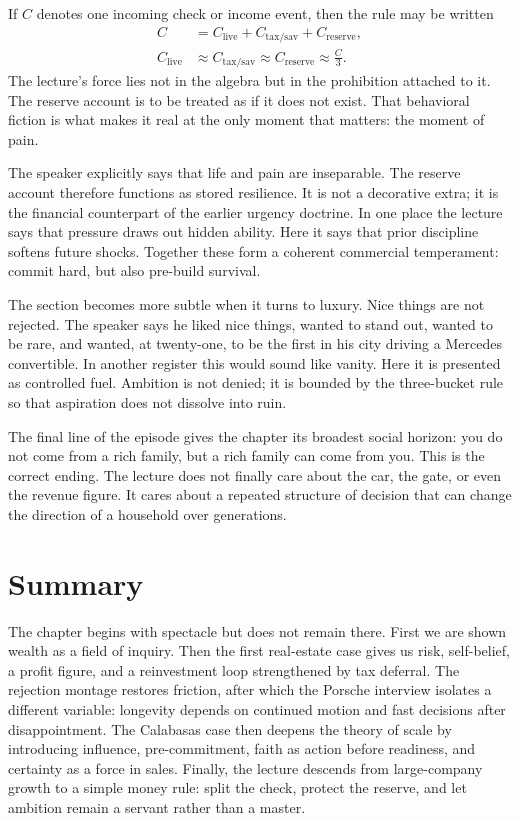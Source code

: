 If \(C\) denotes one incoming check or income event, then the rule may be written
\begin{align}
C &= C_{\text{live}} + C_{\text{tax/sav}} + C_{\text{reserve}},\\
C_{\text{live}} &\approx C_{\text{tax/sav}} \approx C_{\text{reserve}} \approx \frac{C}{3}.
\end{align}
The lecture's force lies not in the algebra but in the prohibition attached to it. The reserve account is to be treated as if it does not exist. That behavioral fiction is what makes it real at the only moment that matters: the moment of pain.

The speaker explicitly says that life and pain are inseparable. The reserve account therefore functions as stored resilience. It is not a decorative extra; it is the financial counterpart of the earlier urgency doctrine. In one place the lecture says that pressure draws out hidden ability. Here it says that prior discipline softens future shocks. Together these form a coherent commercial temperament: commit hard, but also pre-build survival.

The section becomes more subtle when it turns to luxury. Nice things are not rejected. The speaker says he liked nice things, wanted to stand out, wanted to be rare, and wanted, at twenty-one, to be the first in his city driving a Mercedes convertible. In another register this would sound like vanity. Here it is presented as controlled fuel. Ambition is not denied; it is bounded by the three-bucket rule so that aspiration does not dissolve into ruin.

The final line of the episode gives the chapter its broadest social horizon: you do not come from a rich family, but a rich family can come from you. This is the correct ending. The lecture does not finally care about the car, the gate, or even the revenue figure. It cares about a repeated structure of decision that can change the direction of a household over generations.

\section{Summary}

The chapter begins with spectacle but does not remain there. First we are shown wealth as a field of inquiry. Then the first real-estate case gives us risk, self-belief, a profit figure, and a reinvestment loop strengthened by tax deferral. The rejection montage restores friction, after which the Porsche interview isolates a different variable: longevity depends on continued motion and fast decisions after disappointment. The Calabasas case then deepens the theory of scale by introducing influence, pre-commitment, faith as action before readiness, and certainty as a force in sales. Finally, the lecture descends from large-company growth to a simple money rule: split the check, protect the reserve, and let ambition remain a servant rather than a master.

